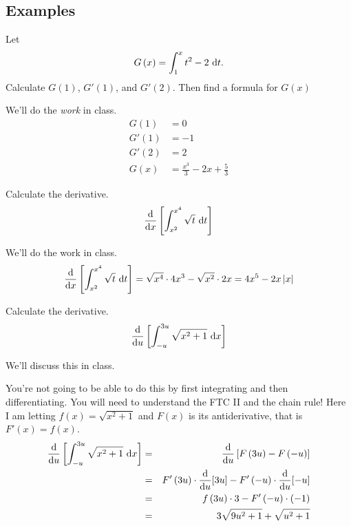 \documentclass[12pt,addpoints, answers, fleqn]{exam}
\begin{document}
\subsection{Examples}
\begin{questions}
\question Let
\[
G\left( x \right) = \int_{1}^x  t^2 - 2 \ {\rm{d}}t.
\]
Calculate $G\left( 1 \right)$, $G'\left( 1 \right)$, and $G'\left( 2 \right)$. Then find a formula for  $G\left( x \right)$

\begin{solution}
We'll do the \emph{work} in class.
\begin{align*}
G\left( 1 \right) &= 0\\
G'\left( 1 \right) &= -1\\
G'\left( 2 \right) &= 2\\
G\left( x \right) &= \frac{x^3}{3}-2x+\frac{5}{3}
\end{align*}
\end{solution}

\question Calculate the derivative.
\[
\frac{{\rm{d}}}{{\rm{d}}x}\left[ \int_{x^2}^{x^4} \sqrt{t} \ {\rm{d}}t \right]
\]

\begin{solution}
We'll do the work in class.
\[
\frac{{\rm{d}}}{{\rm{d}}x}\left[ \int_{x^2}^{x^4} \sqrt{t} \ {\rm{d}}t \right] = \sqrt{x^4} \cdot 4x^3 - \sqrt{x^2} \cdot 2x = 4x^5 - 2x\left|x\right|
\]
\end{solution}

\question Calculate the derivative.
\[
\frac{{\rm{d}}}{{\rm{d}}u}\left[ \int_{-u}^{3u} \sqrt{x^2+1} \ {\rm{d}}x \right]
\]
\begin{solution}
We'll discuss this in class.

You're not going to be able to do this by first integrating and then differentiating. You will need to understand the FTC II and the chain rule! Here I am letting $f \left( x \right) = \sqrt{x^2+1}$ and $F\left( x \right)$ is its antiderivative, that is $F'\left( x \right) = f \left( x \right)$.
\begin{eqnarray*}
\frac{{\rm{d}}}{{\rm{d}}u}\left[ \int_{-u}^{3u} \sqrt{x^2+1} \ {\rm{d}}x \right] &=& \frac{{\rm{d}}}{{\rm{d}}u}\left[  F\left( 3u \right) - F\left( -u \right)\right]\\
&=& F'\left( 3u \right) \cdot  \frac{{\rm{d}}}{{\rm{d}}u}[3u]- F'\left( -u \right) \cdot  \frac{{\rm{d}}}{{\rm{d}}u}[-u]\\
&=& f\left( 3u \right) \cdot  3 - F'\left( -u \right) \cdot  \left( -1 \right)\\
&=& 3 \sqrt{9u^2+1} + \sqrt{u^2+1}
\end{eqnarray*}



\end{solution}


\end{questions}
\end{document}
